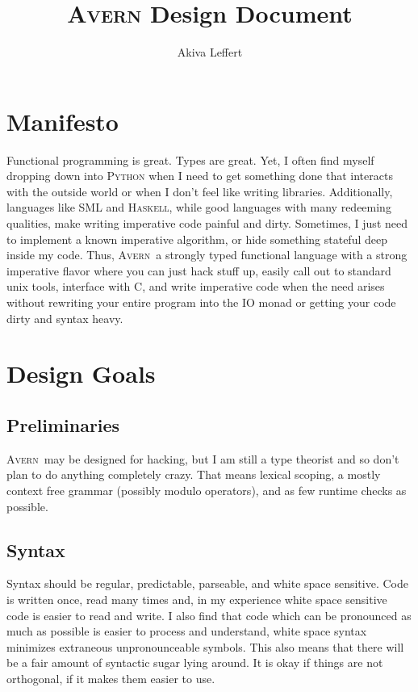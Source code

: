 \documentclass[]{article}
\title{\textsc{Avern} Design Document}
\author{Akiva Leffert}
\newcommand{\avern}{\textsc{Avern}}
\begin{document}
\ifpdf
{}
\else
{}
\fi

\maketitle

\section{Manifesto}
Functional programming is great. Types are great. Yet, I often find myself dropping down into {\textsc{Python}} when I need to get something done that interacts with the outside world or when I don't feel like writing libraries. Additionally, languages like \textsc{SML} and \textsc{Haskell}, while good languages with many redeeming qualities,  make writing imperative code painful and dirty. Sometimes, I just need to implement a known imperative algorithm, or hide something stateful deep inside my code. Thus, \avern\  a strongly typed functional language with a strong imperative flavor where you can just hack stuff up, easily call out to standard unix tools, interface with C, and write imperative code when the need arises without rewriting your entire program into the IO monad or getting your code dirty and syntax heavy. 

\section{Design Goals}
\subsection{Preliminaries}
\avern\ may be designed for hacking, but I am still a type theorist and so don't plan to do anything completely crazy. That means lexical scoping, a mostly context free grammar (possibly modulo operators), and as few runtime checks as possible.

\subsection{Syntax}
Syntax should be regular, predictable, parseable, and white space sensitive. Code is written once, read many times and, in my experience white space sensitive code is easier to read and write. I also find that code which can be pronounced as much as possible is easier to process and understand, white space syntax minimizes extraneous unpronounceable symbols. This also means that there will be a fair amount of syntactic sugar lying around. It is okay if things are not orthogonal, if it makes them easier to use.
\end{document}
